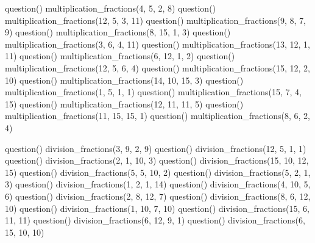 \documentclass["../Cours.tex"]{subfiles}
\begin{document}
\begin{questions}
    \vspace{-1.5em}
        \begin{multicols}{3}\small
        \begin{luacode}
            question() multiplication_fractions(4, 5, 2, 8)
            question() multiplication_fractions(12, 5, 3, 11)
            question() multiplication_fractions(9, 8, 7, 9)
            question() multiplication_fractions(8, 15, 1, 3)
            question() multiplication_fractions(3, 6, 4, 11)
            question() multiplication_fractions(13, 12, 1, 11)
            question() multiplication_fractions(6, 12, 1, 2)
            question() multiplication_fractions(12, 5, 6, 4)
            question() multiplication_fractions(15, 12, 2, 10)
            question() multiplication_fractions(14, 10, 15, 3)
            question() multiplication_fractions(1, 5, 1, 1)
            question() multiplication_fractions(15, 7, 4, 15)
            question() multiplication_fractions(12, 11, 11, 5)
            question() multiplication_fractions(11, 15, 15, 1)
            question() multiplication_fractions(8, 6, 2, 4)
        \end{luacode}
        \end{multicols}

    \clearpage
    \vspace{-1.5em}
        \begin{multicols}{3}\small
        \begin{luacode}
            question() division_fractions(3, 9, 2, 9)
            question() division_fractions(12, 5, 1, 1)
            question() division_fractions(2, 1, 10, 3)
            question() division_fractions(15, 10, 12, 15)
            question() division_fractions(5, 5, 10, 2)
            question() division_fractions(5, 2, 1, 3)
            question() division_fractions(1, 2, 1, 14)
            question() division_fractions(4, 10, 5, 6)
            question() division_fractions(2, 8, 12, 7)
            question() division_fractions(8, 6, 12, 10)
            question() division_fractions(1, 10, 7, 10)
            question() division_fractions(15, 6, 11, 11)
            question() division_fractions(6, 12, 9, 1)
            question() division_fractions(6, 15, 10, 10)
        \end{luacode}
        \end{multicols}
        
\end{questions}
\end{document}

